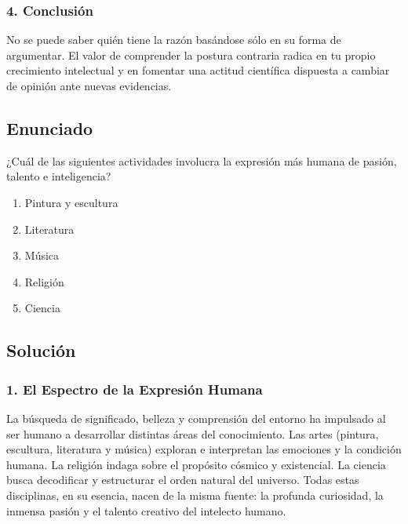 \documentclass[12pt, a4paper]{article}
\begin{document}
\subsubsection*{4. Conclusión}
No se puede saber quién tiene la razón basándose sólo en su forma de argumentar. El valor de comprender la postura contraria radica en tu propio crecimiento intelectual y en fomentar una actitud científica dispuesta a cambiar de opinión ante nuevas evidencias.

\newpage

\subsection*{Enunciado}
¿Cuál de las siguientes actividades involucra la expresión más humana de pasión, talento e inteligencia?
\begin{enumerate}[label=\alph*)]
    \item Pintura y escultura
    \item Literatura
    \item Música
    \item Religión
    \item Ciencia
\end{enumerate}

\subsection*{Solución}

\subsubsection*{1. El Espectro de la Expresión Humana}
La búsqueda de significado, belleza y comprensión del entorno ha impulsado al ser humano a desarrollar distintas áreas del conocimiento. Las artes (pintura, escultura, literatura y música) exploran e interpretan las emociones y la condición humana. La religión indaga sobre el propósito cósmico y existencial. La ciencia busca decodificar y estructurar el orden natural del universo. Todas estas disciplinas, en su esencia, nacen de la misma fuente: la profunda curiosidad, la inmensa pasión y el talento creativo del intelecto humano.
\end{document}
